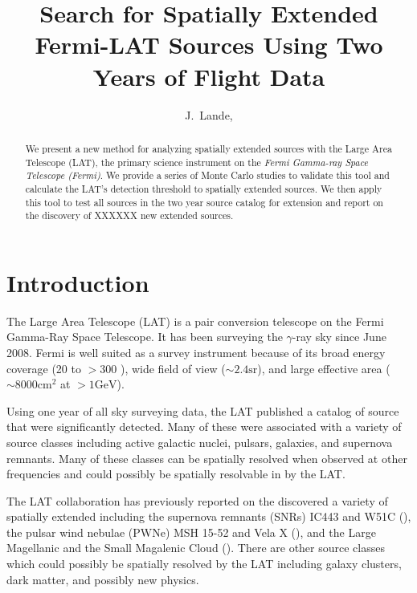 \documentclass[12pt,preprint]{aastex}
\newcommand{\mev}{\text{MeV}\xspace}
\newcommand{\gev}{\text{GeV}\xspace}
\newcommand{\sr}{\text{sr}\xspace}
\newcommand{\cm}{\text{cm}\xspace}
\begin{document}
\title{Search for Spatially Extended Fermi-LAT Sources Using Two Years of Flight
Data}

\author{
J.~Lande, 
}


\begin{abstract}
We present a new method for analyzing spatially extended sources with
the Large Area Telescope (LAT), the primary science instrument
on the {\em Fermi Gamma-ray Space Telescope (Fermi)}.  We provide a
series of Monte Carlo studies to validate this tool
and calculate the LAT's detection threshold to spatially extended
sources.  We then apply this tool to test all sources in the two
year source catalog for extension and report on the discovery
of XXXXXX new extended sources.
\end{abstract}

\section{Introduction}

The Large Area Telescope (LAT) is a pair conversion telescope on the
Fermi Gamma-Ray Space Telescope. It has been surveying the $\gamma$-ray
sky since June 2008.  Fermi is well suited as a survey
instrument because of its broad energy coverage (20 \mev
to $>300$ \gev), wide field of view ($\sim 2.4 \sr$), and large effective
area ($\sim 8000 \cm^2$ at $>1 \gev$).

Using one year of all sky surveying data, the LAT published a catalog of
source that were significantly detected.  Many of these were associated
with a variety of source classes including active galactic nuclei,
pulsars, galaxies, and supernova remnants.  Many of these classes can be
spatially resolved when observed at other frequencies and could possibly
be spatially resolvable in \gev by the LAT.

The LAT collaboration has previously reported on the discovered
a variety of spatially extended including the supernova remnants (SNRs)
IC443 and W51C (\cite{ic443,w51c}),
the pulsar wind nebulae (PWNe) MSH 15-52 and Vela X
(\cite{msh1552,velax}), and the Large Magellanic
and the Small Magalenic Cloud (\cite{lmc,smc}).  There are other
source classes which could possibly be spatially resolved by the LAT
including galaxy clusters, dark matter, and possibly new physics.
\end{document}
